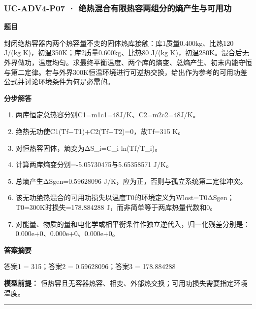 \documentclass[UTF8,11pt,a4paper]{ctexart}
\begin{document}
\subsubsection*{UC-ADV4-P07 · 绝热混合有限热容两组分的熵产生与可用功}
\noindent\textbf{题目}\par
封闭绝热容器内两个热容量不变的固体热库接触：库1质量0.400kg、比热120 J/(kg K)，初温350K；库2质量0.600kg、比热80 J/(kg K)，初温280K。混合后无外界做功，温度均匀。求最终平衡温度、两个库的熵变、总熵产生、初末内能守恒与第二定律。若与外界300K恒温环境进行可逆热交换，给出作为参考的可用功差公式并讨论环境条件为何是必需的。\par
\medskip\noindent\textbf{分步解答}
\begin{enumerate}
\item 两库恒定总热容分别C1=m1c1=48J/K、C2=m2c2=48J/K。
\item 绝热无功使C1(Tf−T1)+C2(Tf−T2)=0，故Tf=315 K。
\item 对恒热容固体，熵变为ΔS\_i=C\_i ln(Tf/T\_i)。
\item 计算两库熵变分别=-5.05730475与5.65358571 J/K。
\item 总熵产生ΔSgen=0.59628096 J/K，应为正，否则与孤立系统第二定律冲突。
\item 该无功绝热混合的可用功损失以温度T0的环境定义为Wlost=T0ΔSgen；T0=300K时损失=178.884288 J，而非简单等于两库热量代数和0。
\item 对能量、物质的量和电化学或相平衡条件作独立逆代入，归一化残差分别是：0.000e+0、0.000e+0、0.000e+0。
\end{enumerate}
\noindent\textbf{答案摘要}\par
答案1 = 315；答案2 = 0.59628096；答案3 = 178.884288\par
\noindent\textbf{模型前提：}
恒热容且无容器热容、相变、外部热交换；可用功损失需要指定环境温度。\par
\medskip\hrule\medskip
{}
\end{document}
